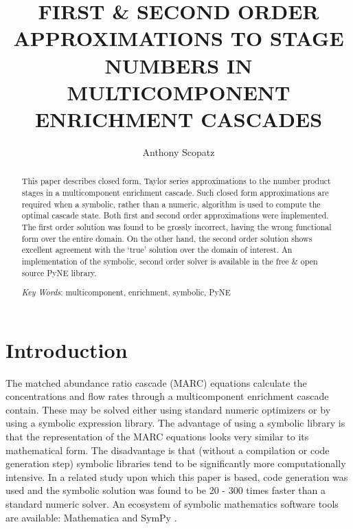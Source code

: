 \documentclass{ansconf}
\begin{document}
\title{FIRST \& SECOND ORDER APPROXIMATIONS TO STAGE NUMBERS IN 
       MULTICOMPONENT ENRICHMENT CASCADES}

\author{Anthony Scopatz}

\maketitle

\begin{abstract}
\raggedright
This paper describes closed form, Taylor series approximations to the number 
product stages in a multicomponent enrichment cascade.  Such closed form 
approximations are required when a symbolic, rather than a numeric, algorithm
is used to compute the optimal cascade state.  Both first and second order 
approximations were implemented.  The first order solution was found to be 
grossly incorrect, having the wrong functional form over the entire domain.
On the other hand, the second order solution shows excellent agreement with 
the `true' solution over the domain of interest. An implementation of the 
symbolic, second order solver is available in the free \& open source 
PyNE library.

\emph{Key Words}: multicomponent, enrichment, symbolic, PyNE
\end{abstract}

\section{Introduction}
\label{sec:intro}

The matched abundance ratio cascade (MARC) equations calculate the concentrations
and flow rates through a multicomponent enrichment cascade contain. These may
be solved either using standard numeric optimizers or by using a symbolic 
expression library.  The advantage of using a symbolic library is that the 
representation of the MARC equations looks very similar to its mathematical form.
The disadvantage is that (without a compilation or code generation step) symbolic 
libraries tend to be significantly more computationally intensive.  In a related 
study upon which this paper is based, code generation was used and the symbolic
solution was found to be 20 - 300 times faster than a standard numeric solver.
An ecosystem of symbolic mathematics software tools are available: 
Mathematica \cite{Wolfram2008}%
and SymPy \cite{SymPy2012}.  
\end{document}
